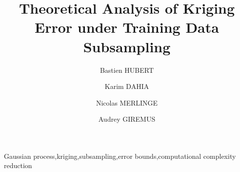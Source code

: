 \documentclass[preprint]{elsarticle}
\begin{document}
\begin{frontmatter}

\title{
    Theoretical Analysis of Kriging Error under Training Data Subsampling
}

\author[ONERA,IMS]{Bastien HUBERT\:}
\author[ONERA]{Karim DAHIA\:}
\author[ONERA]{Nicolas MERLINGE\:}
\author[IMS]{Audrey GIREMUS\:}

\begin{keyword}
    Gaussian process\sep kriging\sep subsampling\sep error bounds\sep computational complexity reduction
\end{keyword}

\end{frontmatter}
\end{document}

